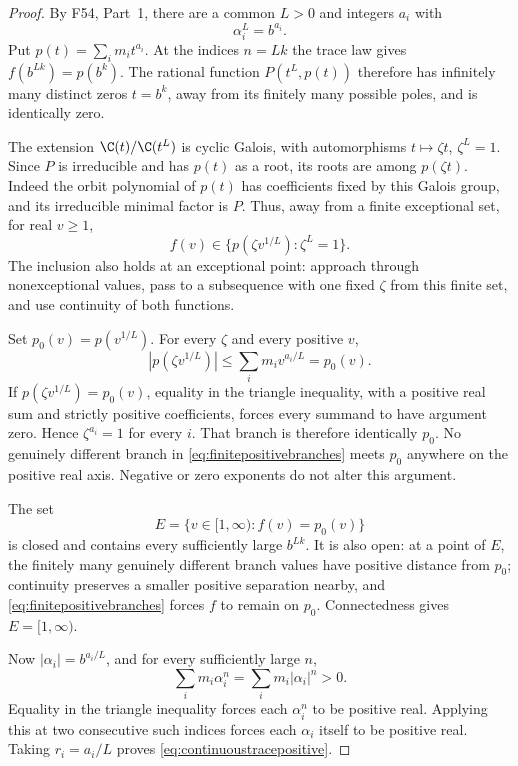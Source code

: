 \documentclass[11pt,a4paper]{article}
\newcommand{\fid}[1]{\textsf{#1}}\newcommand{\gate}[1]{\textsf{#1}}
\theoremstyle{named}\newtheorem{finding}{Finding}[section]
\theoremstyle{definition}\newtheorem{definition}[finding]{Definition}
\theoremstyle{remark}\newtheorem{remark}[finding]{Remark}
\begin{document}
\begin{proof}
By \fid{F54}, Part~1, there are a common $L>0$ and
integers $a_i$ with
\[
 \alpha_i^L=b^{a_i}.
\]
Put $p(t)=\sum_i m_i t^{a_i}$.
At the indices $n=Lk$ the trace law gives
$f(b^{Lk})=p(b^k)$.
The rational function $P(t^L,p(t))$ therefore has
infinitely many distinct zeros $t=b^k$, away from its
finitely many possible poles, and is identically zero.

The extension $\C(t)/\C(t^L)$ is cyclic Galois, with
automorphisms $t\mapsto\zeta t$, $\zeta^L=1$.
Since $P$ is irreducible and has $p(t)$ as a root,
its roots are among $p(\zeta t)$.
Indeed the orbit polynomial of $p(t)$ has coefficients
fixed by this Galois group, and its irreducible minimal
factor is $P$.
Thus, away from a finite exceptional set, for real $v\ge1$,
\begin{equation}\label{eq:finitepositivebranches}
 f(v)\in\{p(\zeta v^{1/L}):\zeta^L=1\}.
\end{equation}
The inclusion also holds at an exceptional point:
approach through nonexceptional values, pass to a
subsequence with one fixed $\zeta$ from this finite set,
and use continuity of both functions.

Set $p_0(v)=p(v^{1/L})$.
For every $\zeta$ and every positive $v$,
\[
 |p(\zeta v^{1/L})|
 \le\sum_i m_i v^{a_i/L}=p_0(v).
\]
If $p(\zeta v^{1/L})=p_0(v)$, equality in the triangle
inequality, with a positive real sum and strictly
positive coefficients, forces every summand to have
argument zero. Hence $\zeta^{a_i}=1$ for every $i$.
That branch is therefore identically $p_0$.
No genuinely different branch in
\eqref{eq:finitepositivebranches} meets $p_0$ anywhere
on the positive real axis. Negative or zero exponents
do not alter this argument.

The set
\[
 E=\{v\in[1,\infty):f(v)=p_0(v)\}
\]
is closed and contains every sufficiently large
$b^{Lk}$. It is also open: at a point of $E$, the
finitely many genuinely different branch values have
positive distance from $p_0$; continuity preserves
a smaller positive separation nearby, and
\eqref{eq:finitepositivebranches} forces $f$ to remain
on $p_0$.
Connectedness gives $E=[1,\infty)$.

Now $|\alpha_i|=b^{a_i/L}$, and for every sufficiently
large $n$,
\[
 \sum_i m_i\alpha_i^n
   =\sum_i m_i|\alpha_i|^n>0.
\]
Equality in the triangle inequality forces each
$\alpha_i^n$ to be positive real. Applying this at two
consecutive such indices forces each $\alpha_i$ itself
to be positive real. Taking $r_i=a_i/L$ proves
\eqref{eq:continuoustracepositive}.


\end{proof}
\end{document}

